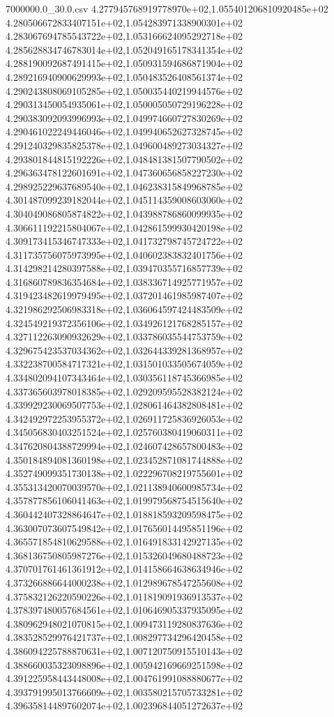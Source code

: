 \begin{filecontents*}{7000000.0_30.0.csv}
4.277945768919778970e+02,1.055401206810920485e+02
4.280506672833407151e+02,1.054283971338900301e+02
4.283067694785543722e+02,1.053166624095292718e+02
4.285628834746783014e+02,1.052049165178341354e+02
4.288190092687491415e+02,1.050931594686871904e+02
4.289216940900629993e+02,1.050483526408561374e+02
4.290243808069105285e+02,1.050035440219944576e+02
4.290313450054935061e+02,1.050005050729196228e+02
4.290383092093996993e+02,1.049974660727830269e+02
4.290461022249446046e+02,1.049940652627328745e+02
4.291240329835825378e+02,1.049600489273034327e+02
4.293801844815192226e+02,1.048481381507790502e+02
4.296363478122601691e+02,1.047360656858227230e+02
4.298925229637689540e+02,1.046238315849968785e+02
4.301487099239182044e+02,1.045114359008603060e+02
4.304049086805874822e+02,1.043988786860099935e+02
4.306611192215804067e+02,1.042861599930420198e+02
4.309173415346747333e+02,1.041732798745724722e+02
4.311735756075973995e+02,1.040602383832401756e+02
4.314298214280397588e+02,1.039470355716857739e+02
4.316860789836354684e+02,1.038336714925771957e+02
4.319423482619979495e+02,1.037201461985987407e+02
4.321986292506983318e+02,1.036064597424483509e+02
4.324549219372356106e+02,1.034926121768285157e+02
4.327112263090932629e+02,1.033786035544753759e+02
4.329675423537034362e+02,1.032644339281368957e+02
4.332238700584717321e+02,1.031501033505674059e+02
4.334802094107343464e+02,1.030356118745366985e+02
4.337365603978018385e+02,1.029209595528382124e+02
4.339929230069507753e+02,1.028061464382808481e+02
4.342492972253955372e+02,1.026911725836926053e+02
4.345056830403251524e+02,1.025760380419060311e+02
4.347620804388729994e+02,1.024607428657800483e+02
4.350184894081360198e+02,1.023452871081744888e+02
4.352749099351730138e+02,1.022296708219755601e+02
4.355313420070039570e+02,1.021138940600985734e+02
4.357877856106041463e+02,1.019979568754515640e+02
4.360442407328864647e+02,1.018818593209598475e+02
4.363007073607549842e+02,1.017656014495851196e+02
4.365571854810629588e+02,1.016491833142927135e+02
4.368136750805987276e+02,1.015326049680488723e+02
4.370701761461361912e+02,1.014158664638634946e+02
4.373266886644000238e+02,1.012989678547255608e+02
4.375832126220590226e+02,1.011819091936913537e+02
4.378397480057684561e+02,1.010646905337935095e+02
4.380962948021070815e+02,1.009473119280837636e+02
4.383528529976421737e+02,1.008297734296420458e+02
4.386094225788870631e+02,1.007120750915510143e+02
4.388660035323098896e+02,1.005942169669251598e+02
4.391225958443448008e+02,1.004761991088880677e+02
4.393791995013766609e+02,1.003580215705733281e+02
4.396358144897602074e+02,1.002396844051272637e+02

\end{filecontents*}
